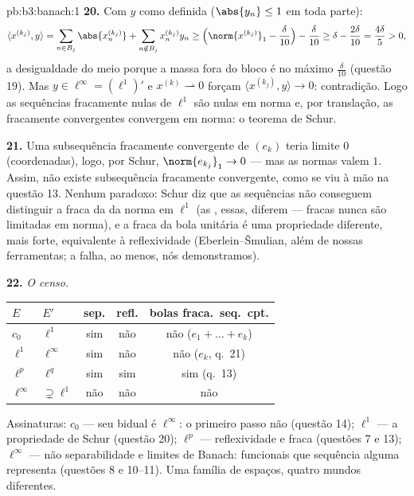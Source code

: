 \begin{solution}{pb:b3:banach:1}
\textbf{20.} Com $y$ como definida ($\abs{y_n} \leq 1$
em toda parte):
\[
\langle x^{(k_j)}, y\rangle
= \sum_{n \in B_j}\abs{x^{(k_j)}_n}
+ \sum_{n \notin B_j}x^{(k_j)}_ny_n
\geq \Bigl(\norm{x^{(k_j)}}_1 - \frac\delta{10}\Bigr) -
\frac\delta{10}
\geq \delta - \frac{2\delta}{10} = \frac{4\delta}5 > 0,
\]
a desigualdade do meio porque a massa fora do bloco é no
máximo $\frac\delta{10}$ (questão 19). Mas $y \in
\ell^\infty = (\ell^1)'$ e $x^{(k)} \rightharpoonup 0$
forçam $\langle x^{(k_j)}, y\rangle \to 0$: contradição.
Logo as sequências fracamente nulas de $\ell^1$ são nulas em norma e, por
translação, as fracamente convergentes convergem em norma: o teorema de
Schur.

\textbf{21.} Uma subsequência fracamente convergente de $(e_k)$ teria
limite $0$ (coordenadas), logo, por Schur, $\norm{e_{k_j}}_1
\to 0$ --- mas as normas valem $1$. Assim, não existe subsequência fracamente
convergente, como se viu à mão na questão 13. Nenhum
paradoxo: Schur diz que as sequências não conseguem distinguir a 
fraca da  da norma em $\ell^1$ (as , essas,
diferem ---  fracas nunca são limitadas em norma), e
a  fraca da bola unitária é uma propriedade diferente,
mais forte, equivalente à reflexividade
(Eberlein--Šmulian, além de nossas ferramentas; a falha, ao
menos, nós demonstramos).

\textbf{22.} \emph{O censo.}
\begin{center}
\begin{tabular}{l|l|c|c|c}
$E$ & $E'$ & sep. & refl. & bolas fraca.\ seq.\ cpt.\\
\hline
$c_0$ & $\ell^1$ & sim & não & não ($e_1{+}\dots{+}e_k$)\\
$\ell^1$ & $\ell^\infty$ & sim & não & não ($e_k$, q.~21)\\
$\ell^p$ & $\ell^q$ & sim & sim & sim (q.~13)\\
$\ell^\infty$ & $\supsetneq\ell^1$ & não & não & não\\
\end{tabular}
\end{center}
Assinaturas: $c_0$ --- seu bidual é $\ell^\infty$: o primeiro
passo não  (questão 14); $\ell^1$ --- a propriedade de
Schur (questão 20); $\ell^p$ --- reflexividade e 
fraca (questões 7 e 13); $\ell^\infty$ ---
não separabilidade e limites de Banach: funcionais que sequência alguma
representa (questões 8 e 10--11). Uma família de espaços,
quatro mundos diferentes.


\end{solution}
